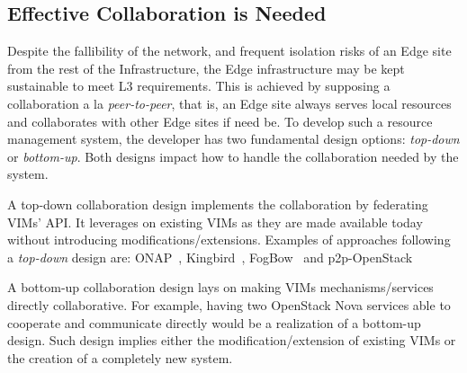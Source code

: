 \subsection{Effective Collaboration is Needed}
Despite the fallibility of the network, and frequent isolation risks
of an Edge site from the rest of the Infrastructure, the Edge
infrastructure may be kept sustainable to meet L3 requirements. This
is achieved by supposing a collaboration a la \emph{peer-to-peer},
that is, an Edge site always serves local resources and collaborates
with other Edge sites if need be. To develop such a resource
management system, the developer has two fundamental design options:
\emph{top-down} or \emph{bottom-up}. Both designs impact how to handle
the collaboration needed by the system.

A top-down collaboration design implements the collaboration by
federating VIMs' API. It leverages on existing VIMs as they are made available today without introducing modifications/extensions. Examples of approaches following a \emph{top-down} design are: ONAP~\cite{onap}, Kingbird~\cite{kingbird}, FogBow~\cite{brasileiro2016fogbow} and p2p-OpenStack~\cite{ericsson-p2p}

A bottom-up collaboration design lays on making VIMs mechanisms/services directly collaborative. For example, having two OpenStack Nova services able to cooperate and communicate directly would be a realization of a bottom-up design. Such design implies either the modification/extension of existing VIMs or the creation of a completely new system.
